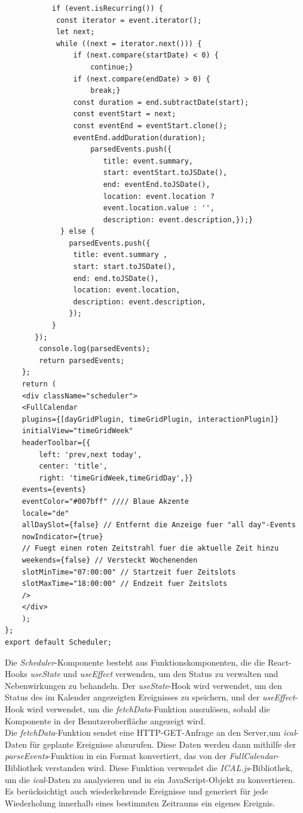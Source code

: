 \begin{lstlisting}
           if (event.isRecurring()) {
           	const iterator = event.iterator();
           	let next;
            while ((next = iterator.next())) {
                if (next.compare(startDate) < 0) {
                    continue;}
                if (next.compare(endDate) > 0) {
                	break;}
                const duration = end.subtractDate(start);
                const eventStart = next;
                const eventEnd = eventStart.clone();
                eventEnd.addDuration(duration);
                    parsedEvents.push({
                       title: event.summary,
                       start: eventStart.toJSDate(),
                       end: eventEnd.toJSDate(),
                       location: event.location ? 
                       event.location.value : '',
                       description: event.description,});}
             } else {
               parsedEvents.push({
                title: event.summary ,
               	start: start.toJSDate(),
               	end: end.toJSDate(),
               	location: event.location,
               	description: event.description,
               });
           }
       });
        console.log(parsedEvents);
        return parsedEvents;
    };
    return (
    <div className="scheduler">
    <FullCalendar
    plugins={[dayGridPlugin, timeGridPlugin, interactionPlugin]}
    initialView="timeGridWeek"
    headerToolbar={{
    	left: 'prev,next today',
    	center: 'title',
    	right: 'timeGridWeek,timeGridDay',}}
    events={events}
    eventColor="#007bff" //// Blaue Akzente
    locale="de"
    allDaySlot={false} // Entfernt die Anzeige fuer "all day"-Events
    nowIndicator={true} 
    // Fuegt einen roten Zeitstrahl fuer die aktuelle Zeit hinzu
    weekends={false} // Versteckt Wochenenden
    slotMinTime="07:00:00" // Startzeit fuer Zeitslots
    slotMaxTime="18:00:00" // Endzeit fuer Zeitslots
    />
    </div>
    );
};
export default Scheduler;
\end{lstlisting}
Die \emph{Scheduler}-Komponente besteht aus Funktionskomponenten, die die React-Hooks \emph{useState} und \emph{useEffect} verwenden, um den Status zu verwalten und Nebenwirkungen zu behandeln. Der \emph{useState}-Hook wird verwendet, um den Status des im Kalender angezeigten Ereignisses zu speichern,  und der \emph{useEffect}-Hook wird verwendet, um die \emph{fetchData}-Funktion auszulösen, sobald die Komponente in der Benutzeroberfläche angezeigt wird.\\
Die \emph{fetchData}-Funktion sendet eine HTTP-GET-Anfrage an den Server,um \emph{ical}-Daten für geplante Ereignisse abzurufen. Diese Daten werden dann mithilfe der \emph{parseEvents}-Funktion in ein Format konvertiert, das von der \emph{FullCalendar}-Bibliothek verstanden wird. Diese Funktion verwendet die \emph{ICAL.js}-Bibliothek, um die \emph{ical}-Daten zu analysieren und in ein JavaScript-Objekt zu konvertieren. Es berücksichtigt auch wiederkehrende Ereignisse und generiert für jede Wiederholung innerhalb eines bestimmten Zeitraums ein eigenes Ereignis.\\
